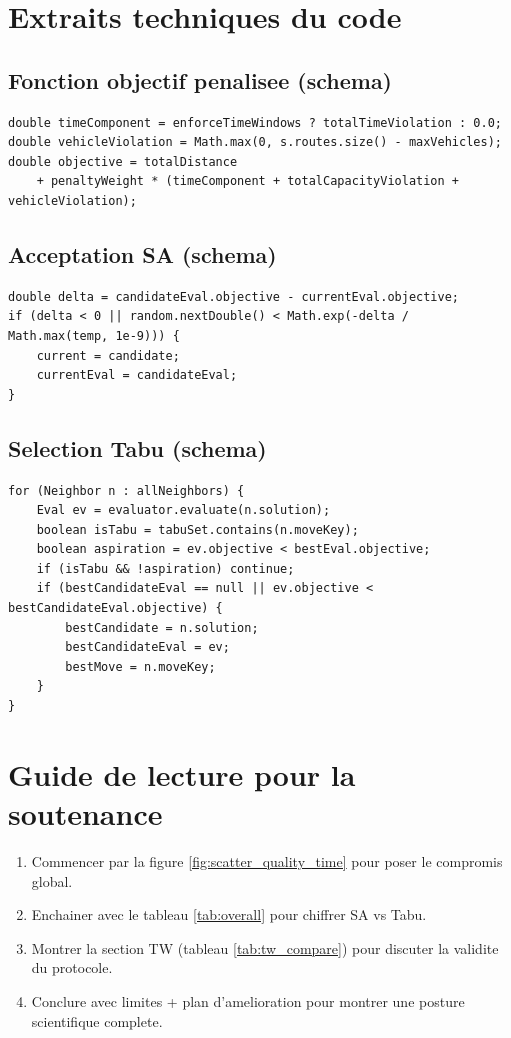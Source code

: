 \documentclass[12pt,a4paper]{report}
\begin{document}
\chapter{Extraits techniques du code}

\section{Fonction objectif penalisee (schema)}
\begin{lstlisting}[style=javastyle]
double timeComponent = enforceTimeWindows ? totalTimeViolation : 0.0;
double vehicleViolation = Math.max(0, s.routes.size() - maxVehicles);
double objective = totalDistance
    + penaltyWeight * (timeComponent + totalCapacityViolation + vehicleViolation);
\end{lstlisting}

\section{Acceptation SA (schema)}
\begin{lstlisting}[style=javastyle]
double delta = candidateEval.objective - currentEval.objective;
if (delta < 0 || random.nextDouble() < Math.exp(-delta / Math.max(temp, 1e-9))) {
    current = candidate;
    currentEval = candidateEval;
}
\end{lstlisting}

\section{Selection Tabu (schema)}
\begin{lstlisting}[style=javastyle]
for (Neighbor n : allNeighbors) {
    Eval ev = evaluator.evaluate(n.solution);
    boolean isTabu = tabuSet.contains(n.moveKey);
    boolean aspiration = ev.objective < bestEval.objective;
    if (isTabu && !aspiration) continue;
    if (bestCandidateEval == null || ev.objective < bestCandidateEval.objective) {
        bestCandidate = n.solution;
        bestCandidateEval = ev;
        bestMove = n.moveKey;
    }
}
\end{lstlisting}

\chapter{Guide de lecture pour la soutenance}
\begin{enumerate}
  \item Commencer par la figure \ref{fig:scatter_quality_time} pour poser le compromis global.
  \item Enchainer avec le tableau \ref{tab:overall} pour chiffrer SA vs Tabu.
  \item Montrer la section TW (tableau \ref{tab:tw_compare}) pour discuter la validite du protocole.
  \item Conclure avec limites + plan d'amelioration pour montrer une posture scientifique complete.
\end{enumerate}
\end{document}

